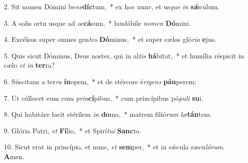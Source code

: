 2. Sit nomen Dómini be\textit{ne}\textbf{díc}tum,~*  ex hoc nunc, et us\textit{que} \textit{in} \textbf{sǽ}culum.\

3. A solis ortu usque ad \textit{oc}\textbf{cá}sum,~*  laudábile \textit{no}\textit{men} \textbf{Dó}mini.\

4. Excélsus super omnes gen\textit{tes} \textbf{Dó}minus,~*  et super cælos gló\textit{ri}\textit{a} \textbf{e}jus.\

5. Quis sicut Dóminus, Deus noster, qui in al\textit{tis} \textbf{há}bitat,~*  et humília réspicit in cælo \textit{et} \textit{in} \textbf{ter}ra?\

6. Súscitans a ter\textit{ra} \textbf{ín}opem,~*  et de stércore é\textit{ri}\textit{gens} \textbf{páu}perem:\

7. Ut cóllocet eum cum \textit{prin}\textbf{cí}pibus,~*  cum princípibus pó\textit{pu}\textit{li} \textbf{su}i.\

8. Qui habitáre facit stérilem \textit{in} \textbf{do}mo,~*  matrem filió\textit{rum} \textit{læ}\textbf{tán}tem.\

9. Glória Patri, \textit{et} \textbf{Fí}lio,~*  et Spirí\textit{tu}\textit{i} \textbf{Sanc}to.\

10. Sicut erat in princípio, et nunc, \textit{et} \textbf{sem}per,~*  et in sǽcula sæcu\textit{ló}\textit{rum}. \textbf{A}men.\

